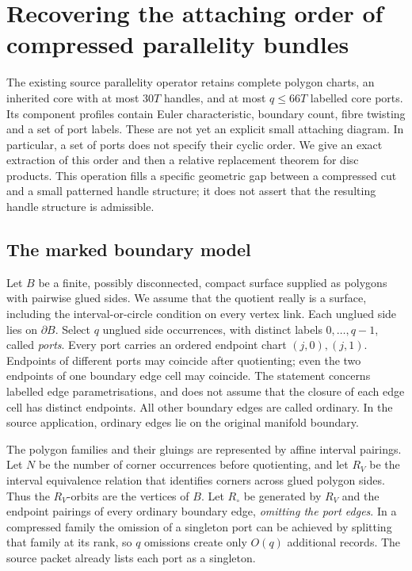 
\section{Recovering the attaching order of compressed parallelity bundles}
\label{sec:port-order}

The existing source parallelity operator retains complete polygon charts, an
inherited core with at most $30T$ handles, and at most $q\leq66T$ labelled
core ports.  Its component profiles contain Euler characteristic, boundary
count, fibre twisting and a set of port labels.  These are not yet an explicit
small attaching diagram.  In particular, a set of ports does not specify their
cyclic order.  We give an exact extraction of this order and then a relative
replacement theorem for disc products.  This operation fills a specific
geometric gap between a compressed cut and a small patterned handle structure;
it does not assert that the resulting handle structure is admissible.

\subsection{The marked boundary model}

Let $B$ be a finite, possibly disconnected, compact surface supplied as
polygons with pairwise glued sides.  We assume that the quotient really is a
surface, including the interval-or-circle condition on every vertex link.
Each unglued side lies on $\partial B$.  Select $q$ unglued side occurrences,
with distinct labels $0,\ldots,q-1$, called \emph{ports}.  Every port carries
an ordered endpoint chart $(j,0),(j,1)$.  Endpoints of different ports may
coincide after quotienting; even the two endpoints of one boundary edge cell
may coincide.  The statement concerns labelled edge parametrisations, and
does not assume that the closure of each edge cell has distinct endpoints.
All other boundary edges are called ordinary.  In the source application,
ordinary edges lie on the original manifold boundary.

The polygon families and their gluings are represented by affine interval
pairings.  Let $N$ be the number of corner occurrences before quotienting,
and let $R_V$ be the interval equivalence relation that identifies corners
across glued polygon sides.  Thus the $R_V$-orbits are the vertices of $B$.
Let $R_\circ$ be generated by $R_V$ and the endpoint pairings of every
ordinary boundary edge, \emph{omitting the port edges}.  In a compressed
family the omission of a singleton port can be achieved by splitting that
family at its rank, so $q$ omissions create only $O(q)$ additional records.
The source packet already lists each port as a singleton.


